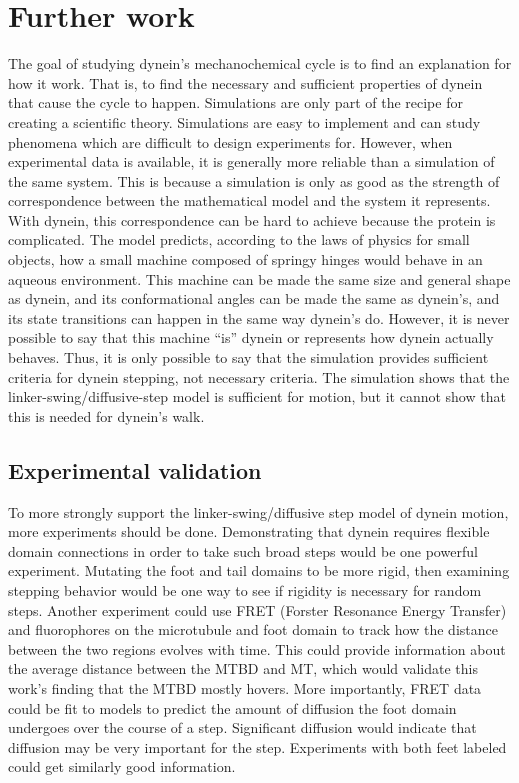 \documentclass[
11pt, %
english, %
singlespacing, %
headsepline, %
chapterinoneline, %
]{MastersDoctoralThesis} %
\begin{document}
\section{Further work}
The goal of studying dynein's mechanochemical cycle is to find an explanation for how it work. That is, to find the necessary and sufficient properties of dynein that cause the cycle to happen. Simulations are only part of the recipe for creating a scientific theory. Simulations are easy to implement and can study phenomena which are difficult to design experiments for. However, when experimental data is available, it is generally more reliable than a simulation of the same system. This is because a simulation is only as good as the strength of correspondence between the mathematical model and the system it represents. With dynein, this correspondence can be hard to achieve because the protein is complicated. The model predicts, according to the laws of physics for small objects, how a small machine composed of springy hinges would behave in an aqueous environment. This machine can be made the same size and general shape as dynein, and its conformational angles can be made the same as dynein's, and its state transitions can happen in the same way dynein's do. However, it is never possible to say that this machine ``is'' dynein or represents how dynein actually behaves. Thus, it is only possible to say that the simulation provides sufficient criteria for dynein stepping, not necessary criteria. The simulation shows that the linker-swing/diffusive-step model is sufficient for motion, but it cannot show that this is needed for dynein's walk.\\

\subsection{Experimental validation}
To more strongly support the linker-swing/diffusive step model of dynein motion, more experiments should be done. Demonstrating that dynein requires flexible domain connections in order to take such broad steps would be one powerful experiment. Mutating the foot and tail domains to be more rigid, then examining stepping behavior would be one way to see if rigidity is necessary for random steps. Another experiment could use FRET (Forster Resonance Energy Transfer) and fluorophores on the microtubule and foot domain to track how the distance between the two regions evolves with time. This could provide information about the average distance between the MTBD and MT, which would validate this work's finding that the MTBD mostly hovers. More importantly, FRET data could be fit to models to predict the amount of diffusion the foot domain undergoes over the course of a step. Significant diffusion would indicate that diffusion may be very important for the step. Experiments with both feet labeled could get similarly good information.\\
\end{document}
